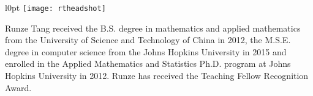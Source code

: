 
\begin{vita}

\begin{wrapfigure}{l}{0pt}
\texttt{[image: rtheadshot]}
\end{wrapfigure}

Runze Tang received the B.S. degree in mathematics and applied mathematics from the University of Science and Technology of China in 2012, the M.S.E. degree in computer science from the Johns Hopkins University in 2015 and enrolled in the Applied Mathematics and Statistics Ph.D. program at Johns Hopkins University in 2012. Runze has received the Teaching Fellow Recognition Award.


\end{vita}